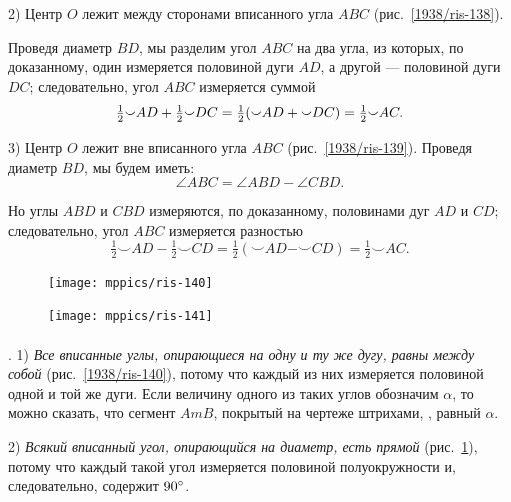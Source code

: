 \documentclass[twoside]{book}
\begin{document}
2) Центр $O$ лежит между сторонами вписанного угла $ABC$ (рис.~\ref{1938/ris-138}).

Проведя диаметр $BD$, мы разделим угол $ABC$ на два угла, из которых, по доказанному, один измеряется половиной дуги $AD$, а другой — половиной дуги $DC$;
следовательно, угол $ABC$ измеряется суммой
\[\tfrac12{\smallsmile}AD\z+\tfrac12{\smallsmile}DC=\tfrac12({\smallsmile}AD\z+{\smallsmile}DC)=\tfrac12{\smallsmile}AC.\]


3) Центр $O$ лежит вне вписанного угла $ABC$ (рис.~\ref{1938/ris-139}).
Проведя диаметр $BD$, мы будем иметь:
\[\angle ABC=\angle ABD-\angle CBD.\]

Но углы $ABD$ и $CBD$ измеряются, по доказанному, половинами дуг $AD$ и $CD$;
следовательно, угол $ABC$ измеряется разностью
\[\tfrac12{\smallsmile}AD-\tfrac12{\smallsmile}CD=\tfrac12({\smallsmile}AD-{\smallsmile}CD)=\tfrac12{\smallsmile}AC.\]

\begin{figure}[h]
\begin{minipage}{.48\textwidth}
\centering
\texttt{[image: mppics/ris-140]}
\end{minipage}
\hfill
\begin{minipage}{.48\textwidth}
\centering
\texttt{[image: mppics/ris-141]}
\end{minipage}

\medskip

\begin{minipage}{.48\textwidth}
\centering
\caption{}\label{1938/ris-140}
\end{minipage}
\hfill
\begin{minipage}{.48\textwidth}
\centering
\caption{}\label{1938/ris-141}
\end{minipage}
\vskip-4mm
\end{figure}

\paragraph{}\label{1938/125}
. 
1) \emph{Все вписанные углы, опирающиеся на одну и ту же дугу, равны между собой} (рис.~\ref{1938/ris-140}), потому что каждый из них измеряется половиной одной и той же дуги.
Если величину одного из таких углов обозначим $\alpha$, то можно сказать, что сегмент $AmB$, покрытый на чертеже штрихами, , равный $\alpha$. 

2) \emph{Всякий вписанный угол, опирающийся на диаметр, есть прямой} (рис.~\ref{1938/ris-141}), потому что каждый такой угол измеряется половиной полуокружности и, следовательно, содержит $90\degree$.
\end{document}
